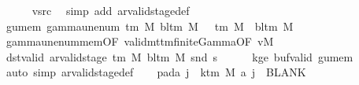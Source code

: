 \begin{isabellebody}
\ \ \ \ \isamarkupfalse%
\ vsrc\ \isamarkupfalse%
\ {\isacharparenleft}{\kern0pt}simp\ add{\isacharcolon}{\kern0pt}\ ar{\isacharunderscore}{\kern0pt}valid{\isacharunderscore}{\kern0pt}stage{\isacharunderscore}{\kern0pt}def{\isacharparenright}{\kern0pt}\isanewline
\ \ \isamarkupfalse%
\ gu{\isacharunderscore}{\kern0pt}mem{\isacharcolon}{\kern0pt}\ {\isachardoublequoteopen}gamma{\isacharunderscore}{\kern0pt}unenum\ {\isacharparenleft}{\kern0pt}{\isasymGamma}{\isacharunderscore}{\kern0pt}tm\ M{\isacharparenright}{\kern0pt}\ {\isacharparenleft}{\kern0pt}bl{\isacharunderscore}{\kern0pt}tm\ M{\isacharparenright}{\kern0pt}\ {}\ {\isasymin}\ {\isasymGamma}{\isacharunderscore}{\kern0pt}tm\ M\ {\isasymunion}\ {\isacharbraceleft}{\kern0pt}bl{\isacharunderscore}{\kern0pt}tm\ M{\isacharbraceright}{\kern0pt}{\isachardoublequoteclose}\isanewline
\ \ \ \ \isamarkupfalse%
\ gamma{\isacharunderscore}{\kern0pt}unenum{\isacharunderscore}{\kern0pt}mem{\isacharbrackleft}{\kern0pt}OF\ valid{\isacharunderscore}{\kern0pt}mttm{\isacharunderscore}{\kern0pt}finite{\isacharunderscore}{\kern0pt}Gamma{\isacharbrackleft}{\kern0pt}OF\ vM{\isacharbrackright}{\kern0pt}{\isacharbrackright}{\kern0pt}\ \isakeywordONE{{\isachardot}{\kern0pt}}\isamarkupfalse%
\isanewline
\ \ \isamarkupfalse%
\ dst{\isacharunderscore}{\kern0pt}valid{\isacharcolon}{\kern0pt}\ {\isachardoublequoteopen}ar{\isacharunderscore}{\kern0pt}valid{\isacharunderscore}{\kern0pt}stage\ {\isacharparenleft}{\kern0pt}{\isasymGamma}{\isacharunderscore}{\kern0pt}tm\ M{\isacharparenright}{\kern0pt}\ {\isacharparenleft}{\kern0pt}bl{\isacharunderscore}{\kern0pt}tm\ M{\isacharparenright}{\kern0pt}\ {\isacharparenleft}{\kern0pt}snd\ {\isacharquery}{\kern0pt}s{\isacharprime}{\kern0pt}{\isacharparenright}{\kern0pt}{\isachardoublequoteclose}\isanewline
\ \ \ \ \isamarkupfalse%
\ kge{}\ buf{\isacharunderscore}{\kern0pt}valid\ gu{\isacharunderscore}{\kern0pt}mem\ \isamarkupfalse%
\ {\isacharparenleft}{\kern0pt}auto\ simp{\isacharcolon}{\kern0pt}\ ar{\isacharunderscore}{\kern0pt}valid{\isacharunderscore}{\kern0pt}stage{\isacharunderscore}{\kern0pt}def{\isacharparenright}{\kern0pt}\isanewline
\ \ \isamarkupfalse%
\ pad{\isacharunderscore}{\kern0pt}a{\isacharcolon}{\kern0pt}\ {\isachardoublequoteopen}{\isasymforall}j\ {\isasymge}\ k{\isacharunderscore}{\kern0pt}tm\ M{\isachardot}{\kern0pt}\ {\isacharquery}{\kern0pt}a\ j\ {\isacharequal}{\kern0pt}\ BLANK{}{\isachardoublequoteclose}\ \isamarkupfalse%

\end{isabellebody}
